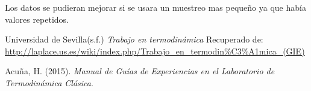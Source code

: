 \documentclass[12pt]{article}
\begin{document}
 Los datos se pudieran mejorar si se usara un muestreo mas pequeño ya que había valores repetidos.  



\begin{thebibliography}{6}

Universidad de Sevilla(s.f.) \textit{Trabajo en termodinámica} Recuperado de:
\url{http://laplace.us.es/wiki/index.php/Trabajo_en_termodin\%C3\%A1mica_(GIE)}

Acu\~na, H. (2015). \textit{Manual de Guías de Experiencias en el Laboratorio de Termodinámica Clásica}.

\end{thebibliography}
\end{document}
